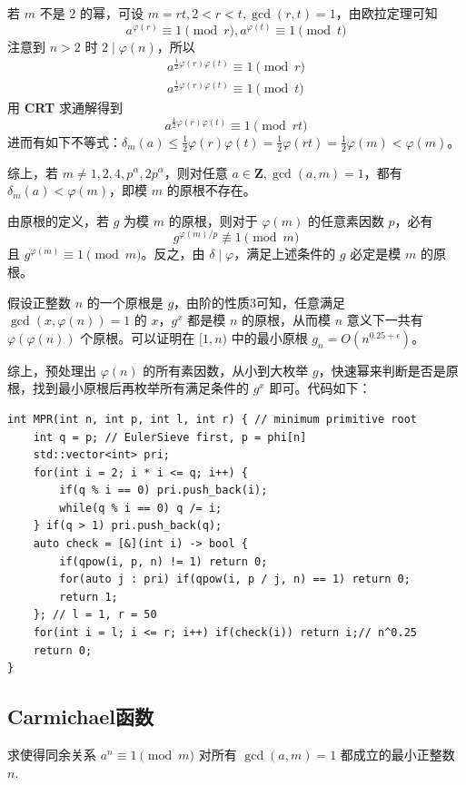 \documentclass[12pt,a4paper]{article}
\begin{document}
若 $m$ 不是 $2$ 的幂，可设 $m=rt,2<r<t,\gcd(r,t)=1$，由欧拉定理可知 
\begin{equation*}
	a^{\varphi(r)}\equiv1\pmod r,a^{\varphi(t)}\equiv1\pmod t
\end{equation*}
注意到 $n>2$ 时 $2\mid\varphi(n)$，所以 
\begin{align*}
	\displaystyle a^{\frac{1}{2}\varphi(r)\varphi(t)}\equiv1\pmod{r}\\
	a^{\frac{1}{2}\varphi(r)\varphi(t)}\equiv1\pmod{t}
\end{align*}
用 \textbf{CRT} 求通解得到 
\begin{equation*}
	\displaystyle a^{\frac{1}{2}\varphi(r)\varphi(t)}\equiv1\pmod{rt}
\end{equation*}
进而有如下不等式：$\displaystyle\delta_m(a)\le\frac{1}{2}\varphi(r)\varphi(t)=\frac{1}{2}\varphi(rt)=\frac{1}{2}\varphi(m)<\varphi(m)$。

综上，若 $m\neq 1,2,4,p^\alpha,2p^\alpha$，则对任意 $a\in\mathbf{Z},\gcd(a,m)=1$，都有 $\delta_m(a)<\varphi(m)$，即模 $m$ 的原根不存在。

由原根的定义，若 $g$ 为模 $m$ 的原根，则对于 $\varphi(m)$ 的任意素因数 $p$，必有 
\begin{equation*}
	g^{\varphi(m)/p}\not\equiv1\pmod{m}
\end{equation*}
且 $g^{\varphi(m)}\equiv1\pmod m$。反之，由 $\delta\mid\varphi$，满足上述条件的 $g$ 必定是模 $m$ 的原根。

假设正整数 $n$ 的一个原根是 $g$，由阶的性质3可知，任意满足 $\gcd(x,\varphi(n))=1$ 的 $x$，$g^x$ 都是模 $n$ 的原根，从而模 $n$ 意义下一共有 $\varphi(\varphi(n))$ 个原根。可以证明在 $[1,n)$ 中的最小原根 $g_n=O(n^{0.25+\epsilon})$。

综上，预处理出 $\varphi(n)$ 的所有素因数，从小到大枚举 $g$，快速幂来判断是否是原根，找到最小原根后再枚举所有满足条件的 $g^x$ 即可。代码如下：
\begin{lstlisting}
int MPR(int n, int p, int l, int r) { // minimum primitive root
	int q = p; // EulerSieve first, p = phi[n]
	std::vector<int> pri;
	for(int i = 2; i * i <= q; i++) {
		if(q % i == 0) pri.push_back(i);
		while(q % i == 0) q /= i;
	} if(q > 1) pri.push_back(q);
	auto check = [&](int i) -> bool {
		if(qpow(i, p, n) != 1) return 0;
		for(auto j : pri) if(qpow(i, p / j, n) == 1) return 0;
		return 1;
	}; // l = 1, r = 50
	for(int i = l; i <= r; i++) if(check(i)) return i;// n^0.25
	return 0;
}
\end{lstlisting}
\subsection{Carmichael函数}
\begin{mdframed}[leftline=true, linewidth=2pt, linecolor=gray]
	求使得同余关系 $a^n\equiv 1\pmod{m}$ 对所有 $\gcd(a,m)=1$ 都成立的最小正整数 $n$. 
\end{mdframed}
\end{document}
